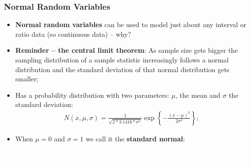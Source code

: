 \documentclass[aspectratio=169]{beamer}
\theoremstyle{principle}
\begin{document}
\begin{frame}
\frametitle{Normal Random Variables}

\begin{itemize}
\item \textbf{Normal random variables} can be used to model just about any interval or ratio data (so continuous data) -- why?
\bigskip

\item \textbf{Reminder -- the central limit theorem}: As sample size gets bigger the sampling distribution of a sample statistic increasingly follows a normal distribution and the standard deviation of that normal distribution gets smaller;
\bigskip

\item Has a probability distribution with two parameters: $\mu$, the mean and $\sigma$ the standard deviation:
\begin{align*}
N(x,\mu,\sigma) = \frac{1}{\sqrt{2*3.1416*\sigma^2}}\exp\left\{-\frac{(x - \mu)^2}{2\sigma^2}\right\};
\end{align*}

\item[]\color{white} When $\mu = 0$ and $\sigma = 1$ we call it the \textbf{standard normal}:
\begin{align*}
\color{white}N(x,\mu=0,\sigma=1) = \frac{1}{\sqrt{2*3.1416}}\exp\left\{-\frac{x^2}{2}\right\}.
\end{align*}

\end{itemize}

\end{frame}
\end{document}
